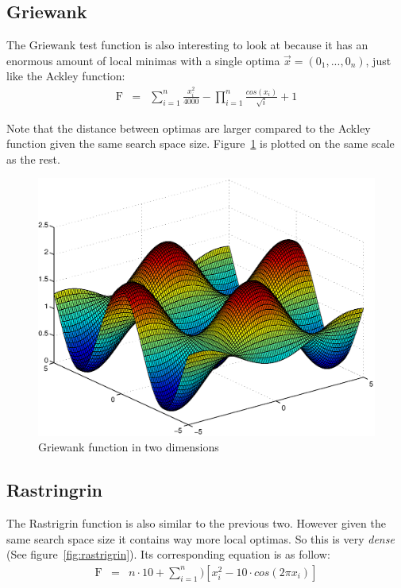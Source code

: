 \documentclass{acm_proc_article-sp}
\begin{document}
\subsection{Griewank}
The Griewank test function is also interesting to look at because it has an enormous amount of local minimas with a single optima $\vec{x} = (0_1, ..., 0_n)$, just like the Ackley function:
\begin{eqnarray*}
\mathop{F(\vec{x})} &=& \sum\limits_{i=1}^{n}\frac{x_i^2}{4000} - \prod\limits_{i=1}^{n}\frac{cos(x_i)}{\sqrt{i}} + 1
\end{eqnarray*}

Note that the distance between optimas are larger compared to the Ackley function given the same search space size. Figure~\ref{fig:griewank} is plotted on the same scale as the rest. 
\begin{figure}[ht]
\centering
\includegraphics[scale=0.4]{fig-griewank}
\caption{Griewank function in two dimensions}\label{fig:griewank}
\end{figure}

\subsection{Rastringrin}
The Rastrigrin function is also similar to the previous two. However given the same search space size it contains way more local optimas. So this is very \emph{dense} (See figure~\ref{fig:rastrigrin}). Its corresponding equation is as follow:
\begin{eqnarray*}
\mathop{F(\vec{x})} &=& n \cdot 10 + \sum\limits_{i=1}^{n})[x_i^2 - 10 \cdot cos(2\pi x_i)]
\end{eqnarray*}
\end{document}
